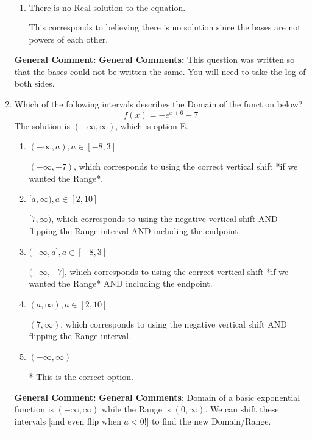 \documentclass{extbook}[14pt]
\newcommand{\litem}[1]{\item #1

\rule{\textwidth}{0.4pt}}
\begin{document}
\begin{enumerate}
{\begin{enumerate}[label=\Alph*.]
$x = -4.043$, which corresponds to distributing the $\ln(base)$ to the second term of the exponent only.
\item \( \text{There is no Real solution to the equation.} \)

This corresponds to believing there is no solution since the bases are not powers of each other.
\end{enumerate}

\textbf{General Comment:} \textbf{General Comments:} This question was written so that the bases could not be written the same. You will need to take the log of both sides.
}
\litem{
Which of the following intervals describes the Domain of the function below?
\[ f(x) = -e^{x+6}-7 \]The solution is \( (-\infty, \infty) \), which is option E.\begin{enumerate}[label=\Alph*.]
\item \( (-\infty, a), a \in [-8, 3] \)

$(-\infty, -7)$, which corresponds to using the correct vertical shift *if we wanted the Range*.
\item \( [a, \infty), a \in [2, 10] \)

$[7, \infty)$, which corresponds to using the negative vertical shift AND flipping the Range interval AND including the endpoint.
\item \( (-\infty, a], a \in [-8, 3] \)

$(-\infty, -7]$, which corresponds to using the correct vertical shift *if we wanted the Range* AND including the endpoint.
\item \( (a, \infty), a \in [2, 10] \)

$(7, \infty)$, which corresponds to using the negative vertical shift AND flipping the Range interval.
\item \( (-\infty, \infty) \)

* This is the correct option.
\end{enumerate}

\textbf{General Comment:} \textbf{General Comments}: Domain of a basic exponential function is $(-\infty, \infty)$ while the Range is $(0, \infty)$. We can shift these intervals [and even flip when $a<0$!] to find the new Domain/Range.
}
\end{enumerate}
\end{document}
